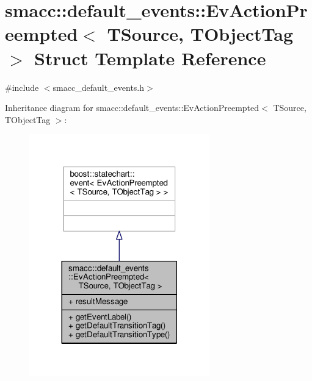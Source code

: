 \hypertarget{structsmacc_1_1default__events_1_1EvActionPreempted}{}\section{smacc\+:\+:default\+\_\+events\+:\+:Ev\+Action\+Preempted$<$ T\+Source, T\+Object\+Tag $>$ Struct Template Reference}
\label{structsmacc_1_1default__events_1_1EvActionPreempted}


{\ttfamily \#include $<$smacc\+\_\+default\+\_\+events.\+h$>$}



Inheritance diagram for smacc\+:\+:default\+\_\+events\+:\+:Ev\+Action\+Preempted$<$ T\+Source, T\+Object\+Tag $>$\+:\nopagebreak
\begin{figure}[H]
\begin{center}
\leavevmode
\includegraphics[width=221pt]{structsmacc_1_1default__events_1_1EvActionPreempted__inherit__graph}
\end{center}
\end{figure}


